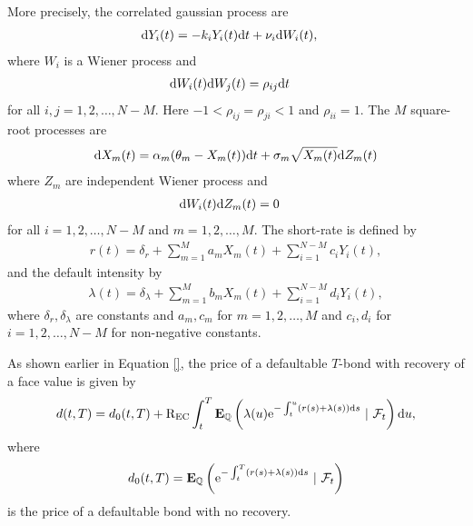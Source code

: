 More precisely, the correlated gaussian process are
\begin{align}
\mathrm{d} Y_i(t) &= - k_i Y_i(t) \mathrm{d} t + \nu_i \mathrm{d} W_i (t),
\end{align}
where $W_i$ is a Wiener process and 
\begin{align}
\mathrm{d} W_i (t) \mathrm{d} W_j (t) &= \rho_{ij} \mathrm{d} t    
\end{align}
for all $i,j = 1,2, \ldots, N-M$. Here $-1 < \rho_{ij} = \rho_{ji} < 1$ and $\rho_{ii} = 1$. The $M$ square-root processes are
\begin{align}
\mathrm{d} X_m(t) = \alpha_m ( \theta_m - X_m(t) ) \mathrm{d} t + \sigma_m \sqrt{ X_m(t) } \mathrm{d} Z_m (t)
\end{align}
where $Z_m$ are independent Wiener process and
\begin{align}
\mathrm{d} W_i (t) \mathrm{d} Z_m (t) &= 0    
\end{align}
for all $i = 1,2, \ldots, N-M$ and $m = 1,2, \ldots, M$. The short-rate is defined by
\begin{align}
\label{riskfree_process}
r(t) = \delta_r + \sum_{m=1}^{M} a_mX_m(t) + \sum_{i=1}^{N-M} c_iY_i(t),
\end{align}
and the default intensity by
\begin{align}
\label{spreadprocess}
\lambda(t) = \delta_{\lambda} + \sum_{m=1}^{M} b_mX_m(t) + \sum_{i=1}^{N-M} d_iY_i(t),
\end{align}
where $\delta_r, \delta_{\lambda}$ are constants and $a_m, c_m$ for $m=1,2, \ldots, M$ and $c_i, d_i$ for $i=1,2, \ldots, N-M$ for non-negative constants.

As shown earlier in Equation \ref{}, the price of a defaultable $T$-bond with recovery of a face value is given by
	\begin{align}
		d(t,T) = d_0(t,T) +\mathrm{R_{EC}} \int_t^T \operatorname{\boldsymbol{\mathrm{E}}}_{\mathbb{Q}} \left( \lambda(u) \mathrm{e}^{ - \int_t^u (r(s) + \lambda(s)) \mathrm{d} s } \ | \ \mathcal{F}_t \right) \mathrm{d} u ,
	\end{align}
where
	\begin{align}
		d_0(t,T) = \operatorname{\boldsymbol{\mathrm{E}}}_{\mathbb{Q}} \left( \mathrm{e}^{ - \int_t^T (r(s) + \lambda(s)) \mathrm{d} s } \ | \ \mathcal{F}_t \right)
	\end{align}
is the price of a defaultable bond with no recovery.

